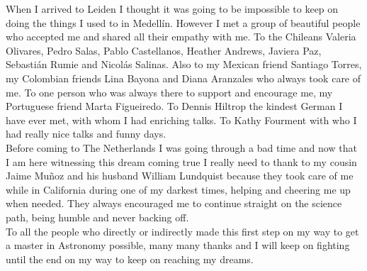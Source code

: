 When I arrived to Leiden I thought it was going to be impossible to keep on doing the things I used to in Medell\'in. However I met a group of beautiful people who accepted me and shared all their empathy with me. To the Chileans Valeria Olivares, Pedro Salas, Pablo Castellanos, Heather Andrews, Javiera Paz, Sebasti\'an Rumie and Nicol\'as Salinas. Also to my Mexican friend Santiago Torres, my Colombian friends Lina Bayona and Diana Aranzales who always took care of me. To one person who was always there to support and encourage me, my Portuguese friend Marta Figueiredo. To Dennis Hiltrop the kindest German I have ever met, with whom I had enriching talks. To Kathy Fourment with who I had really nice talks and funny days.\\

Before coming to The Netherlands I was going through a bad time and now that I am here witnessing this dream coming true I really need to thank to my cousin Jaime Mu\~noz and his husband William Lundquist because they took care of me while in California during one of my darkest times, helping and cheering me up when needed. They always encouraged me to continue straight on the science path, being humble and never backing off.\\ 

To all the people who directly or indirectly made this first step on my way to get a master in Astronomy possible, many many thanks and I will keep on fighting until the end on my way to keep on reaching my dreams.

\endgroup



